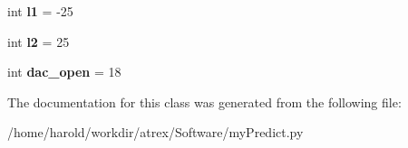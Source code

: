 \begin{DoxyCompactItemize}
\item 
\hypertarget{classmyPredict_1_1myPredict_a6b9c00f63edbf64fb570418b1f1a6905}{int {\bfseries l1} = -\/25}\label{classmyPredict_1_1myPredict_a6b9c00f63edbf64fb570418b1f1a6905}

\item 
\hypertarget{classmyPredict_1_1myPredict_a0bc5d7a9a57b15ae0c59e43e8e83d56e}{int {\bfseries l2} = 25}\label{classmyPredict_1_1myPredict_a0bc5d7a9a57b15ae0c59e43e8e83d56e}

\item 
\hypertarget{classmyPredict_1_1myPredict_a984cd2295737fe88f8e0d5e34070bf67}{int {\bfseries dac\-\_\-open} = 18}\label{classmyPredict_1_1myPredict_a984cd2295737fe88f8e0d5e34070bf67}

\end{DoxyCompactItemize}


The documentation for this class was generated from the following file\-:\begin{DoxyCompactItemize}
\item 
/home/harold/workdir/atrex/\-Software/my\-Predict.\-py\end{DoxyCompactItemize}
